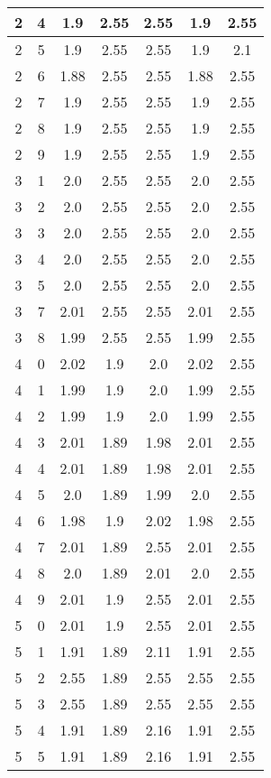 \begin{longtable}{|c|c||c||c|c||c|c|}
	2 & 4 & 1.9 & 2.55 & 2.55 & 1.9 & 2.55 \\ \hline
	2 & 5 & 1.9 & 2.55 & 2.55 & 1.9 & 2.1 \\ \hline
	2 & 6 & 1.88 & 2.55 & 2.55 & 1.88 & 2.55 \\ \hline
	2 & 7 & 1.9 & 2.55 & 2.55 & 1.9 & 2.55 \\ \hline
	2 & 8 & 1.9 & 2.55 & 2.55 & 1.9 & 2.55 \\ \hline
	2 & 9 & 1.9 & 2.55 & 2.55 & 1.9 & 2.55 \\ \hline
	3 & 1 & 2.0 & 2.55 & 2.55 & 2.0 & 2.55 \\ \hline
	3 & 2 & 2.0 & 2.55 & 2.55 & 2.0 & 2.55 \\ \hline
	3 & 3 & 2.0 & 2.55 & 2.55 & 2.0 & 2.55 \\ \hline
	3 & 4 & 2.0 & 2.55 & 2.55 & 2.0 & 2.55 \\ \hline
	3 & 5 & 2.0 & 2.55 & 2.55 & 2.0 & 2.55 \\ \hline
	3 & 7 & 2.01 & 2.55 & 2.55 & 2.01 & 2.55 \\ \hline
	3 & 8 & 1.99 & 2.55 & 2.55 & 1.99 & 2.55 \\ \hline
	4 & 0 & 2.02 & 1.9 & 2.0 & 2.02 & 2.55 \\ \hline
	4 & 1 & 1.99 & 1.9 & 2.0 & 1.99 & 2.55 \\ \hline
	4 & 2 & 1.99 & 1.9 & 2.0 & 1.99 & 2.55 \\ \hline
	4 & 3 & 2.01 & 1.89 & 1.98 & 2.01 & 2.55 \\ \hline
	4 & 4 & 2.01 & 1.89 & 1.98 & 2.01 & 2.55 \\ \hline
	4 & 5 & 2.0 & 1.89 & 1.99 & 2.0 & 2.55 \\ \hline
	4 & 6 & 1.98 & 1.9 & 2.02 & 1.98 & 2.55 \\ \hline
	4 & 7 & 2.01 & 1.89 & 2.55 & 2.01 & 2.55 \\ \hline
	4 & 8 & 2.0 & 1.89 & 2.01 & 2.0 & 2.55 \\ \hline
	4 & 9 & 2.01 & 1.9 & 2.55 & 2.01 & 2.55 \\ \hline
	5 & 0 & 2.01 & 1.9 & 2.55 & 2.01 & 2.55 \\ \hline
	5 & 1 & 1.91 & 1.89 & 2.11 & 1.91 & 2.55 \\ \hline
	5 & 2 & 2.55 & 1.89 & 2.55 & 2.55 & 2.55 \\ \hline
	5 & 3 & 2.55 & 1.89 & 2.55 & 2.55 & 2.55 \\ \hline
	5 & 4 & 1.91 & 1.89 & 2.16 & 1.91 & 2.55 \\ \hline
	5 & 5 & 1.91 & 1.89 & 2.16 & 1.91 & 2.55 \\ \hline

\end{longtable}
